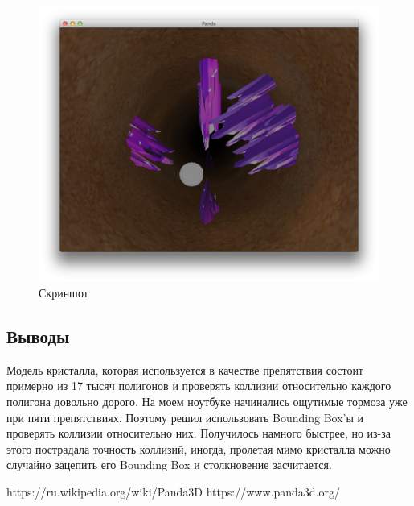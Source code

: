 \documentclass[12pt]{article}
\begin{document}
\begin{figure}[!htb]
  \centering
    \includegraphics[scale=0.5]{pics/game.png}
   \caption{Скриншот}
    \label{fig:game}
\end{figure}

\subsection*{Выводы}
Модель кристалла, которая используется в качестве препятствия состоит примерно
из 17 тысяч полигонов и проверять коллизии относительно каждого полигона довольно
дорого. На моем ноутбуке начинались ощутимые тормоза уже при пяти препятствиях.
Поэтому решил использовать Bounding Box'ы и проверять коллизии относительно них.
Получилось намного быстрее, но из-за этого пострадала точность коллизий, иногда,
пролетая мимо кристалла можно случайно зацепить его Bounding Box и столкновение
засчитается.

\begin{thebibliography}{}
 https://ru.wikipedia.org/wiki/Panda3D
 https://www.panda3d.org/
\end{thebibliography}
\end{document}
